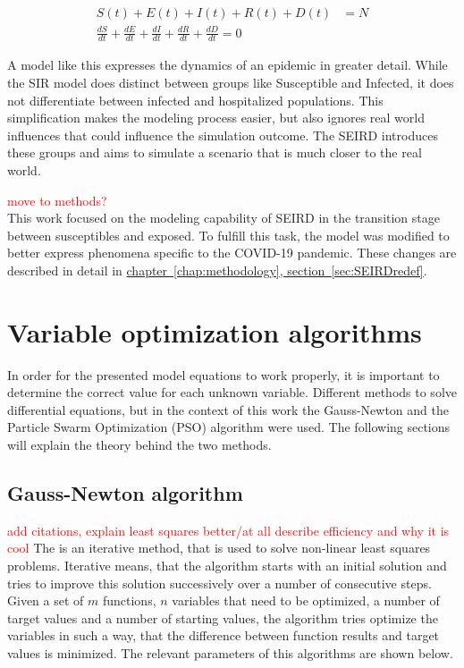 \begin{align}
	\label{eq:SEIRD2}
	S(t) + E(t) + I(t) + R(t) + D(t) &= N \\
	\frac{dS}{dt} + \frac{dE}{dt}  + \frac{dI}{dt} + \frac{dR}{dt} + \frac{dD}{dt} = 0
\end{align}


A model like this expresses the dynamics of an epidemic in greater detail. While the SIR model does distinct between
groups like Susceptible and Infected, it does not differentiate between infected and hospitalized populations. This simplification
makes the modeling process easier, but also ignores real world influences that could influence the simulation outcome.
The SEIRD introduces these groups and aims to simulate a scenario that is much closer to the real world.\newline

\textcolor{red}{move to methods?}\\
This work focused on the modeling capability of SEIRD in the transition stage between susceptibles and exposed. To fulfill this
task, the model was modified to better express phenomena specific to the COVID-19 pandemic. These changes are described in detail
in \hyperref[sec:SEIRDredef]{chapter~\ref*{chap:methodology}, section~\ref*{sec:SEIRDredef}}.


\section{Variable optimization algorithms}
In order for the presented model equations to work properly, it is important to determine the correct value for each unknown variable.
Different methods to solve differential equations, but in the context of this work the Gauss-Newton and the Particle Swarm Optimization (PSO)
algorithm were used. The following sections will explain the theory behind the two methods.


\subsection{Gauss-Newton algorithm}
\textcolor{red}{add citations, explain least squares better/at all}
\textcolor{red}{describe efficiency and why it is cool}
\label{sec:Gauss}
The  is an iterative method, that is used to solve non-linear least squares problems. Iterative means, that the algorithm 
starts with an initial solution and tries to improve this solution successively over a number of consecutive steps.
Given a set of $m$ functions, $n$ variables that need to be optimized, a number of target values and a number of starting values, the algorithm tries
optimize the variables in such a way, that the difference between function results and target values is minimized.
The relevant parameters of this algorithms are shown below. 


